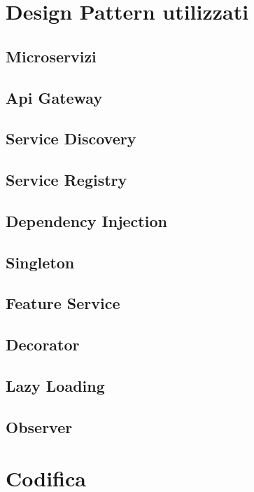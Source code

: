 \begin{namespacedesc}
\end{namespacedesc}


\section{Design Pattern utilizzati}
\subsection{Microservizi}
\subsection{Api Gateway}
\subsection{Service Discovery}
\subsection{Service Registry}
\subsection{Dependency Injection}
\subsection{Singleton}
\subsection{Feature Service}
\subsection{Decorator}
\subsection{Lazy Loading}
\subsection{Observer}

\section{Codifica}

